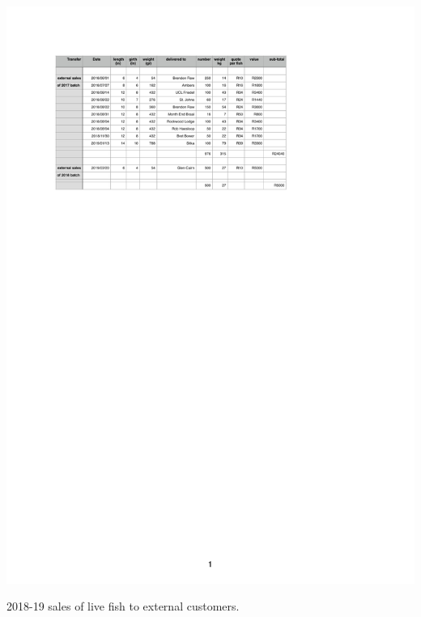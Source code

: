 \begin{table}[H]
  \centering
  \includegraphics[scale = 1.2]{tables/TablesExternalSales.pdf}
   \caption{2018-19 sales of live fish to external customers.}
  \label{tab:ExternalSales2018}
\end{table}


